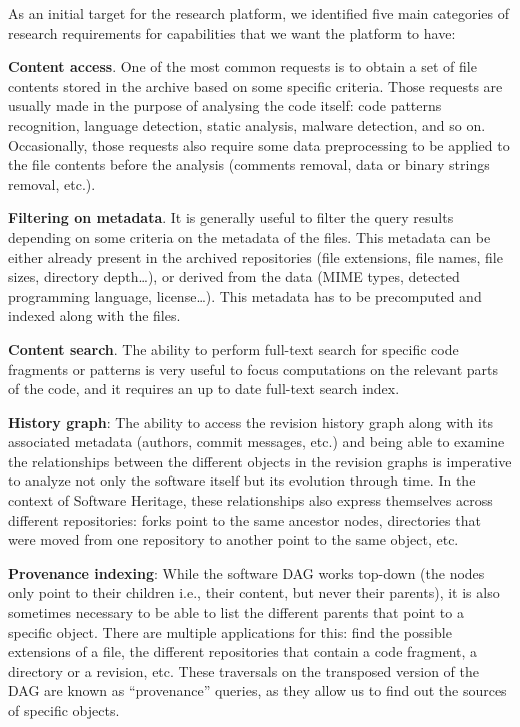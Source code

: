 As an initial target for the research platform, we identified five main
categories of research requirements for capabilities that we want the platform
to have:

\textbf{Content access}. One of the most common requests is to obtain a set of
file contents stored in the archive based on some specific criteria. Those
requests are usually made in the purpose of analysing the code itself: code
patterns recognition, language detection, static analysis, malware detection,
and so on.  Occasionally, those requests also require some data preprocessing
to be applied to the file contents before the analysis (comments removal, data
or binary strings removal, etc.).

\textbf{Filtering on metadata}. It is generally useful to filter the query
results depending on some criteria on the metadata of the files. This metadata
can be either already present in the archived repositories (file extensions,
file names, file sizes, directory depth…), or derived from the data (MIME
types, detected programming language, license…). This metadata has to be
precomputed and indexed along with the files.

\textbf{Content search}. The ability to perform full-text search for
specific code fragments or patterns is very useful to focus
computations on the relevant parts of the code, and it requires an up
to date full-text search index.

\textbf{History graph}: The ability to access the revision history graph along
with its associated metadata (authors, commit messages, etc.) and being able to
examine the relationships between the different objects in the revision graphs
is imperative to analyze not only the software itself but its evolution through
time. In the context of Software Heritage, these relationships also express
themselves across different repositories: forks point to the same ancestor
nodes, directories that were moved from one repository to another point to the
same object, etc.

\textbf{Provenance indexing}: While the software DAG works top-down (the nodes
only point to their children i.e., their content, but never their parents), it
is also sometimes necessary to be able to list the different parents that point
to a specific object. There are multiple applications for this: find the
possible extensions of a file, the different repositories that contain a code
fragment, a directory or a revision, etc. These traversals on the transposed
version of the DAG are known as ``provenance'' queries, as they allow us to
find out the sources of specific objects.


